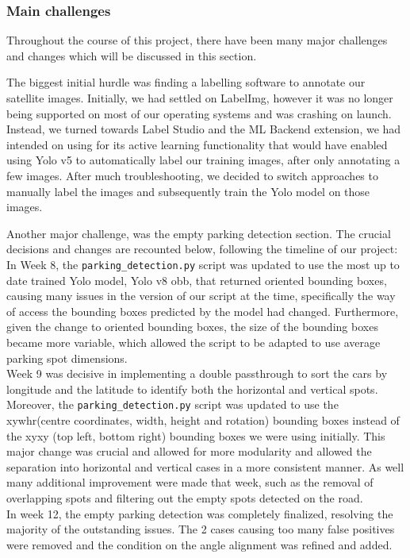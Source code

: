 \subsubsection{Main challenges}
Throughout the course of this project, there have been many major challenges and changes which will be discussed in this section.

The biggest initial hurdle was finding a labelling software to annotate our satellite images. Initially, we had settled on LabelImg, however it was no longer being supported on most of our operating systems and was crashing on launch.
Instead, we turned towards Label Studio and the ML Backend extension, we had intended on using for its active learning functionality that would have enabled using Yolo v5 to automatically label our training images, after only annotating a few images.
After much troubleshooting, we decided to switch approaches to manually label the images and subsequently train the Yolo model on those images.

Another major challenge, was the empty parking detection section. The crucial decisions and changes are recounted below, following the timeline of our project: \\
In Week 8, the \texttt{parking\_detection.py} script was updated to use the most up to date trained Yolo model, Yolo v8 obb, that returned oriented bounding boxes, causing many issues in the version of our script at the time, specifically the way of access the bounding boxes predicted by the model had changed.
Furthermore, given the change to oriented bounding boxes, the size of the bounding boxes became more variable, which allowed the script to be adapted to use average parking spot dimensions.\\
Week 9 was decisive in implementing a double passthrough to sort the cars by longitude and the latitude to identify both the horizontal and vertical spots.
Moreover, the \texttt{parking\_detection.py} script was updated to use the xywhr(centre coordinates, width, height and rotation) bounding boxes instead of the xyxy (top left, bottom right)  bounding boxes we were using initially.
This major change was crucial and allowed for more modularity and allowed the separation into horizontal and vertical cases in a more consistent manner. As well many additional improvement were made that week, such as the removal of overlapping spots and filtering out the empty spots detected on the road.\\
In week 12, the empty parking detection was completely finalized, resolving the majority of the outstanding issues. The 2 cases causing too many false positives were removed and the condition on the angle alignment was refined and added.

